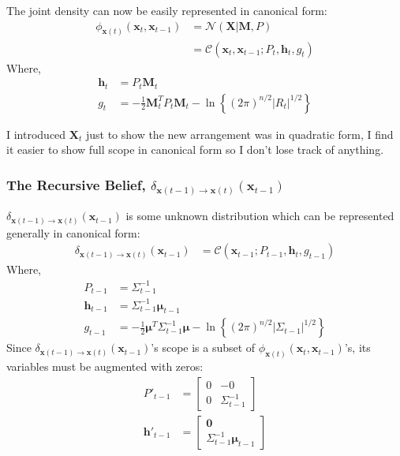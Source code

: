 The joint density can now be easily represented in canonical form:
\begin{align}
\phi_{\pmb{x}(t)} (\pmb{x}_{t}, \pmb{x}_{t-1}) &= \mathcal{N}\left( \pmb{X} | \pmb{M}, P \right) \nonumber \\
&= \mathcal{C} \left( \pmb{x}_t, \pmb{x}_{t-1} ; P_t, \pmb{h}_{t}, g_{t} \right)
\end{align}
Where, 
\begin{align}
\pmb{h}_{t} &= P_{t} \pmb{M}_{t} \\
g_{t} &= -\frac{1}{2} \pmb{M}^{T}_{t} P_{t} \pmb{M}_{t} - \ln{ \left\{ (2 \pi)^{n/2} | R_{t} |^{1/2} \right\} }
\end{align}
\begin{remark}
I introduced $\pmb{X}_{t}$ just to show the new arrangement was in quadratic form, I find it easier to show full scope in canonical form  so I don't lose track of anything.
\end{remark}

\subsubsection{The Recursive Belief, $\delta_{\pmb{x}(t-1) \rightarrow \pmb{x}(t)} (\pmb{x}_{t-1})$}
\label{subsubsection:rec_bel}

$\delta_{\pmb{x}(t-1) \rightarrow \pmb{x}(t)} (\pmb{x}_{t-1})$ is some unknown distribution which can be represented generally in canonical form:
\begin{align}
\delta_{\pmb{x}(t-1) \rightarrow \pmb{x}(t)} (\pmb{x}_{t-1})&= \mathcal{C}\left( \pmb{x}_{t-1}; P_{t-1}, \pmb{h}_{t}, g_{t-1} \right) 
\end{align}
Where, 
\begin{align}
P_{t-1} &= \Sigma^{-1}_{t-1} \\
\mathbf{h}_{t-1} &= \Sigma_{t-1}^{-1} \pmb{\mu}_{t-1} \\
g_{t-1} &= -\frac{1}{2}\pmb{\mu}^{T} \Sigma_{t-1}^{-1} \pmb{\mu} - \ln{ \left\{ (2 \pi)^{n/2} | \Sigma_{t-1} |^{1/2} \right\} }
\end{align}
Since $  \delta_{\pmb{x}(t-1) \rightarrow \pmb{x}(t)} (\pmb{x}_{t-1}) $'s scope is a subset of $\phi_{\pmb{x}(t)} (\pmb{x}_{t}, \pmb{x}_{t-1})$'s, its variables must be augmented with zeros:
\begin{align}
P'_{t-1} &= \begin{bmatrix} 0 & -0 \\ 0 &  \Sigma^{-1}_{t-1} \end{bmatrix}\\
\mathbf{h}'_{t-1} &= \begin{bmatrix} \pmb{0} \\ \Sigma_{t-1}^{-1} \pmb{\mu}_{t-1} \end{bmatrix} 
\end{align}

